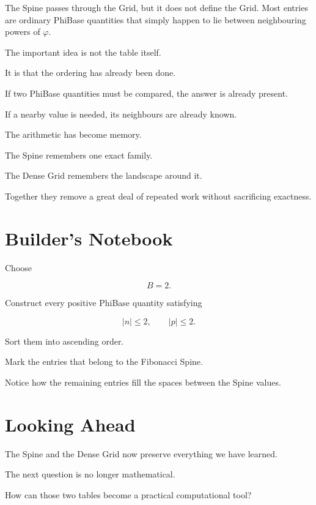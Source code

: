 The Spine passes through the Grid, but it does not define the Grid. Most entries are ordinary PhiBase quantities that simply happen to lie between neighbouring powers of \(\varphi\).

The important idea is not the table itself.

It is that the ordering has already been done.

If two PhiBase quantities must be compared, the answer is already present.

If a nearby value is needed, its neighbours are already known.

The arithmetic has become memory.

The Spine remembers one exact family.

The Dense Grid remembers the landscape around it.

Together they remove a great deal of repeated work without sacrificing exactness.

\section*{Builder's Notebook}

Choose

\[
B=2.
\]

Construct every positive PhiBase quantity satisfying

\[
|n|\le2,
\qquad
|p|\le2.
\]

Sort them into ascending order.

Mark the entries that belong to the Fibonacci Spine.

Notice how the remaining entries fill the spaces between the Spine values.

\section*{Looking Ahead}

The Spine and the Dense Grid now preserve everything we have learned.

The next question is no longer mathematical.

How can those two tables become a practical computational tool?
